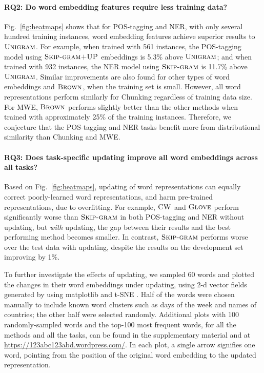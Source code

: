 \documentclass[11pt]{article}
\newcommand{\RQ}[1][1]{\textbf{RQ#1}\xspace}
\newcommand{\figref}[2][]{Fig#1.~\ref{#2}\xspace}
\newcommand{\method}[2][]{\ensuremath{\textsc{#2#1}}\xspace}
\newcommand{\unigram}[1][]{\method{Unigram}}
\newcommand{\brown}[1][]{\method[\ensuremath{_{#1}}]{Brown}}
\newcommand{\CW}[1][]{\method[#1]{CW}}
\newcommand{\Skipgram}[1][]{\method[#1]{Skip-gram}}
\newcommand{\Glove}[1][]{\method[#1]{Glove}}
\newcommand{\withup}{\method{+UP}}
\newcommand{\task}[1]{\textsf{#1}\xspace}
\newcommand{\pos}{\task{POS-tagging}}
\newcommand{\chunking}{\task{Chunking}}
\newcommand{\ner}{\task{NER}}
\newcommand{\mwe}{\task{MWE}}
\begin{document}
\paragraph{\RQ[2]: Do word embedding features require less training data?}
\figref{fig:heatmaps} shows that for \pos and \ner, with only several hundred training instances, 
word embedding features achieve superior results to \unigram. 
For example, when trained with 561 instances, the \pos model using \Skipgram[\withup] embeddings is 5.3\% above
\unigram; and when trained with 932 instances, the \ner model using \Skipgram is 11.7\% above \unigram. 
Similar improvements are also found for other types of word embeddings and \brown, when the training set is small. 
However, all word representations perform similarly for \chunking
regardless of training data size.
For \mwe, \brown performs slightly better than the other methods when
trained with approximately 25\% of the training instances. 
Therefore, we conjecture that the \pos and \ner tasks benefit more from
distributional similarity than \chunking and \mwe.

\paragraph{\RQ[3]: Does task-specific updating improve all word embeddings across all tasks?}
Based on \figref{fig:heatmaps}, updating of word representations can
equally correct poorly-learned word representations, and harm
pre-trained representations, due to overfitting.
For example, \CW and \Glove perform significantly worse than \Skipgram
in both \pos and \ner without updating, but \emph{with} updating, the
gap between their results and the best performing method becomes
smaller. In contrast, \Skipgram performs worse over the test data with
updating, despite the results on the development set improving by 1\%.

To further investigate the effects of updating, we sampled 60 words and
plotted the changes in their word embeddings under updating, using 2-d
vector fields generated by using matplotlib and t-SNE \cite{vanderMaaten:Hinton:2008}. Half
of the words were chosen manually to include known word clusters such as
days of the week and names of countries; the other half were selected
randomly. Additional plots with 100 randomly-sampled words and the
top-100 most frequent words, for all the methods and all the tasks, can
be found in the supplementary material and at
\url{https://123abc123abd.wordpress.com/}.  In each plot, a single arrow
signifies one word, pointing from the position of the original word embedding to the updated representation.
\end{document}
